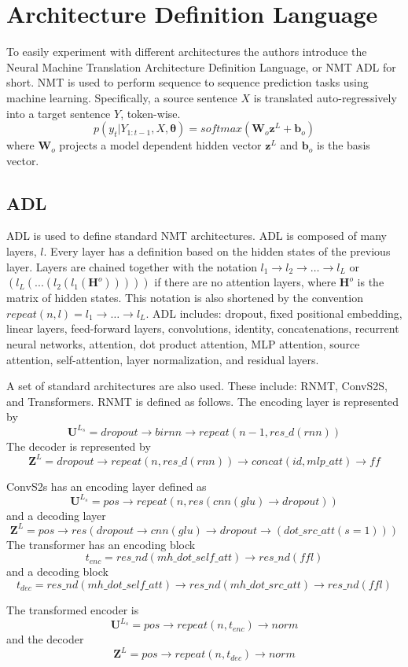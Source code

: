 \section{Architecture Definition Language}
To easily experiment with different architectures the authors introduce the
Neural Machine Translation Architecture Definition Language, or NMT ADL for
short. NMT is used to perform sequence to sequence prediction tasks using
machine learning. Specifically, a source sentence $X$ is translated
auto-regressively into a target sentence $Y$, token-wise.
\[
    p(y_t | Y_{1:t-1}, X, \bm{\theta}) = softmax(\bm{W}_o \bm{z}^L + \bm{b}_o)
\]
where $\bm{W}_o$ projects a model dependent hidden vector $\bm{z}^L$ and
$\bm{b}_o$ is the basis vector.

\subsection{ADL}
ADL is used to define standard NMT architectures. ADL is composed of many
layers, $l$. Every layer has a definition based on the hidden states of the
previous layer. Layers are chained together with the notation $l_1 \rightarrow
l_2 \rightarrow \dots \rightarrow l_L$ or $(l_L(...(l_2(l_1(\bm{H}^o)))))$ if
there are no attention layers, where $\bm{H}^o$ is the matrix of hidden states.
This notation is also shortened by the convention $repeat(n,l) = l_1 \rightarrow
\dots \rightarrow l_L$. ADL includes: dropout, fixed positional embedding,
linear layers, feed-forward layers, convolutions, identity, concatenations,
recurrent neural networks, attention, dot product attention, MLP attention,
source attention, self-attention, layer normalization, and residual layers. 

A set of standard architectures are also used. These include: RNMT, ConvS2S, and
Transformers. RNMT is defined as follows. The encoding layer is represented by 
\[
    \bm{U}^{L_s} = dropout \rightarrow birnn \rightarrow repeat(n-1, res\_d(rnn))
\]
The decoder is represented by 
\[
    \bm{Z}^L = dropout \rightarrow repeat(n, res\_d(rnn)) \rightarrow concat(id,
            mlp\_att) \rightarrow ff
\]

ConvS2s has an encoding layer defined as
\[
    \bm{U}^{L_s} = pos \rightarrow repeat(n, res(cnn(glu) \rightarrow dropout))
\]
and a decoding layer
\[
    \bm{Z}^L = pos \rightarrow res(dropout \rightarrow cnn(glu) \rightarrow
            dropout \rightarrow (dot\_src\_att(s=1)))
\]
The transformer has an encoding block
\[
    t_{enc} = res\_nd(mh\_dot\_self\_att) \rightarrow res\_nd(ffl)
\]
and a decoding block
\[
    t_{dec} = res\_nd(mh\_dot\_self\_att) \rightarrow res\_nd(mh\_dot\_src\_att)
    \rightarrow res\_nd(ffl)
\]

The transformed encoder is
\[
    \bm{U}^{L_s} = pos \rightarrow repeat(n, t_{enc}) \rightarrow norm
\]
and the decoder
\[
    \bm{Z}^L = pos \rightarrow repeat(n,t_{dec}) \rightarrow norm
\]
